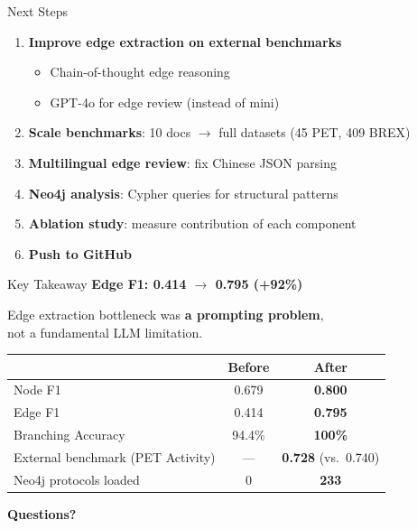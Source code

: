 \documentclass[aspectratio=169, 12pt]{beamer}
\begin{document}
\begin{frame}{Next Steps}
\begin{enumerate}
    \item \textbf{Improve edge extraction on external benchmarks}
    \begin{itemize}
        \item Chain-of-thought edge reasoning
        \item GPT-4o for edge review (instead of mini)
    \end{itemize}
    \item \textbf{Scale benchmarks}: 10 docs $\rightarrow$ full datasets (45 PET, 409 BREX)
    \item \textbf{Multilingual edge review}: fix Chinese JSON parsing
    \item \textbf{Neo4j analysis}: Cypher queries for structural patterns
    \item \textbf{Ablation study}: measure contribution of each component
    \item \textbf{Push to GitHub}
\end{enumerate}
\end{frame}

\begin{frame}{Key Takeaway}
\centering
\vspace{1cm}
{\Large\bfseries Edge F1: 0.414 $\rightarrow$ 0.795 \textcolor{goldgreen}{(+92\%)}}

\vspace{0.5cm}
{\large Edge extraction bottleneck was \textbf{a prompting problem},\\not a fundamental LLM limitation.}

\vspace{0.8cm}
\begin{tabular}{lcc}
\toprule
& \textbf{Before} & \textbf{After} \\
\midrule
Node F1 & 0.679 & \textbf{0.800} \\
Edge F1 & 0.414 & \textbf{0.795} \\
Branching Accuracy & 94.4\% & \textbf{100\%} \\
External benchmark (PET Activity) & --- & \textbf{0.728} (vs.\ 0.740) \\
Neo4j protocols loaded & 0 & \textbf{233} \\
\bottomrule
\end{tabular}
\end{frame}

\begin{frame}
\centering
\vspace{2cm}
{\Huge\bfseries Questions?}
\end{frame}
\end{document}
